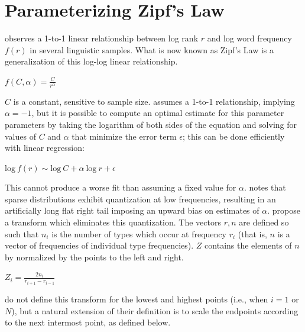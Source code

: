 \chapter{Parameterizing Zipf's Law} 
\label{zr}

\citet{Zipf1949} observes a 1-to-1 linear relationship between log rank $r$ and log word frequency $f(r)$ in several linguistic samples. What is now known as Zipf's Law is a generalization of this log-log linear relationship.

\begin{unlabeledexample} 
$\displaystyle f(C, \alpha) = \frac{C}{r^\alpha}$ 
\end{unlabeledexample} 

\noindent 
$C$ is a constant, sensitive to sample size. \citeauthor{Zipf1949} assumes a 1-to-1 relationship, implying $\alpha = -1$, but it is possible to compute an optimal estimate for this parameter parameters by taking the logarithm of both sides of the equation and solving for values of $C$ and $\alpha$ that minimize the error term $\epsilon$; this can be done efficiently with linear regression:

\begin{unlabeledexample} 
$\displaystyle \textrm{log}~f(r) \sim \textrm{log}~C + \alpha~\textrm{log}~r + \epsilon$  
\end{unlabeledexample}

\noindent
This cannot produce a worse fit than assuming a fixed value for $\alpha$. \citet{Good1953} notes that sparse distributions exhibit quantization at low frequencies, resulting in an artificially long flat right tail imposing an upward bias on estimates of $\alpha$. \citet[][29]{Church1991} propose a transform which eliminates this quantization. The vectors $r, n$ are defined so such that $n_i$ is the number of types which occur at frequency $r_i$ (that is, $n$ is a vector of frequencies of individual type frequencies). $Z$ contains the elements of $n$ by normalized by the points to the left and right.

\begin{unlabeledexample}
$\displaystyle Z_i = \frac{2 n_i}{r_{i + 1} - r_{i - 1}}$
\end{unlabeledexample}

\noindent \citeauthor{Church1991} do not define this transform for the lowest and highest points (i.e., when $i = 1$ or $N$), but a natural extension of their definition is to scale the endpoints according to the next intermost point, as defined below.

